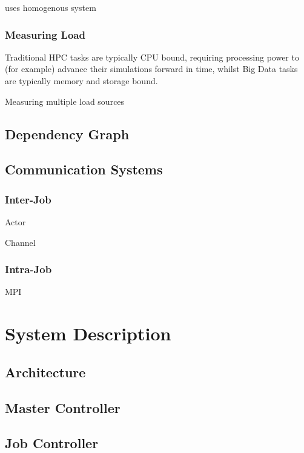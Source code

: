 \documentclass[a4paper,12pt,oldfontcommands]{memoir}
\begin{document}
uses homogenous system
\cite{6176}


\subsection{Measuring Load}

Traditional \gls{HPC} tasks are typically CPU bound, requiring processing power to (for example) advance their simulations forward in time, whilst Big Data tasks are typically memory and storage bound.

Measuring multiple load sources
\cite{1039771}


\section{Dependency Graph}

\section{Communication Systems}

\subsection{Inter-Job}

Actor 

Channel

\subsection{Intra-Job}

MPI

\chapter{System Description}

\section{Architecture}

\section{Master Controller}

\section{Job Controller}
\end{document}
